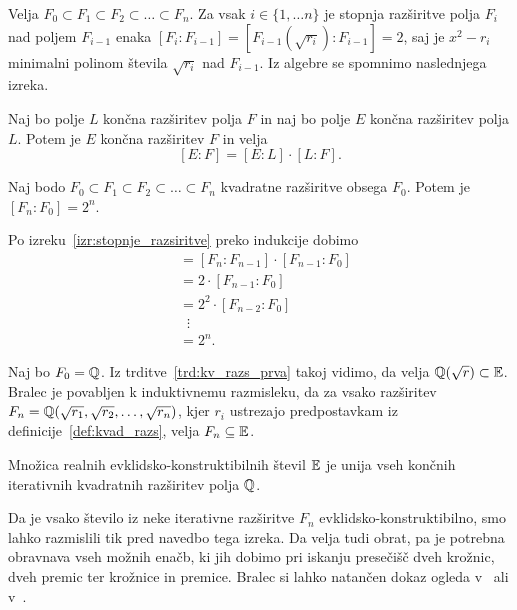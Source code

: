 
Velja $F_0 \subset F_1 \subset F_2 \subset \ldots \subset F_n$. Za vsak $i \in \{1, \ldots n\}$ je stopnja razširitve polja $F_i$ nad poljem $F_{i-1}$ enaka $[F_i : F_{i-1}] = [F_{i-1}(\sqrt{r_{i}}) : F_{i-1}] = 2$, saj je $x^2 - r_{i}$ minimalni polinom števila $\sqrt{r_{i}}$ nad $F_{i-1}$. Iz algebre se spomnimo naslednjega izreka.

\begin{izrek}
    \label{izr:stopnje_razsiritve}
    Naj bo polje $L$ končna razširitev polja $F$ in naj bo polje $E$ končna razširitev polja $L$. Potem je $E$ končna razširitev $F$ in velja
    $$ [E : F] = [E : L] \cdot[L : F].$$
\end{izrek}
\begin{posledica}
    \label{posl:kvadr_razs}
    Naj bodo $F_0 \subset F_1 \subset F_2 \subset \ldots \subset F_n$ kvadratne razširitve obsega $F_0$. Potem je $[F_n : F_0] = 2^n$.
\end{posledica}
\begin{dokaz}
    Po izreku~\ref{izr:stopnje_razsiritve} preko indukcije dobimo
    \begin{align*}
        [F_n : F_0] &= [F_n : F_{n-1}] \cdot [F_{n-1} : F_0] \\
        &= 2 \cdot [F_{n-1} : F_0] \\
        &= 2^2 \cdot [F_{n-2} : F_0] \\
        & \; \; \vdots \\
        &= 2^n.
    \end{align*}
\end{dokaz}

Naj bo $F_0 = \mathbb Q$. Iz trditve~\ref{trd:kv_razs_prva} takoj vidimo, da velja $\mathbb Q(\sqrt{r}) \subset \mathbb E$. Bralec je povabljen k induktivnemu razmisleku, da za vsako razširitev $ F_n = \mathbb Q(\sqrt{r_1}, \sqrt{r_2}, \ldots, \sqrt{r_n})$, kjer $r_i$ ustrezajo predpostavkam iz definicije~\ref{def:kvad_razs}, velja $F_n \subseteq \mathbb E$.

\begin{izrek}
    Množica realnih evklidsko-konstruktibilnih števil $\mathbb E$ je unija vseh končnih iterativnih kvadratnih razširitev polja $\mathbb Q$.
\end{izrek}

Da je vsako število iz neke iterativne razširitve $F_n$ evklidsko-konstruktibilno, smo lahko razmislili tik pred navedbo tega izreka. Da velja tudi obrat, pa je potrebna obravnava vseh možnih enačb, ki jih dobimo pri iskanju presečišč dveh krožnic, dveh premic ter krožnice in premice. Bralec si lahko natančen dokaz ogleda v~\cite[str.\ 38--39]{geometricconstructions} ali v~\cite{jerman1998}.

